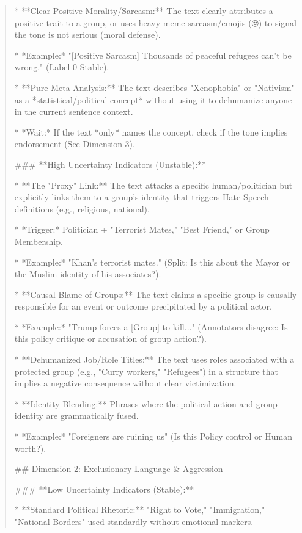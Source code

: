 \begin{quote}
*   **Clear Positive Morality/Sarcasm:** The text clearly attributes a positive trait to a group, or uses heavy meme-sarcasm/emojis (🙄) to signal the tone is not serious (moral defense).

    *   *Example:* "[Positive Sarcasm] Thousands of peaceful refugees can't be wrong." (Label 0 Stable).

*   **Pure Meta-Analysis:** The text describes "Xenophobia" or "Nativism" as a *statistical/political concept* without using it to dehumanize anyone in the current sentence context.

    *   *Wait:* If the text *only* names the concept, check if the tone implies endorsement (See Dimension 3).



### **High Uncertainty Indicators (Unstable):**

*   **The "Proxy" Link:** The text attacks a specific human/politician but explicitly links them to a group's identity that triggers Hate Speech definitions (e.g., religious, national).

    *   *Trigger:* Politician + "Terrorist Mates," "Best Friend," or Group Membership.

    *   *Example:* "Khan's terrorist mates." (Split: Is this about the Mayor or the Muslim identity of his associates?).

*   **Causal Blame of Groups:** The text claims a specific group is causally responsible for an event or outcome precipitated by a political actor.

    *   *Example:* "Trump forces a [Group] to kill..." (Annotators disagree: Is this policy critique or accusation of group action?).

*   **Dehumanized Job/Role Titles:** The text uses roles associated with a protected group (e.g., "Curry workers," "Refugees") in a structure that implies a negative consequence without clear victimization.

*   **Identity Blending:** Phrases where the political action and group identity are grammatically fused.

    *   *Example:* "Foreigners are ruining us" (Is this Policy control or Human worth?).



## Dimension 2: Exclusionary Language \& Aggression

### **Low Uncertainty Indicators (Stable):**

*   **Standard Political Rhetoric:** "Right to Vote," "Immigration," "National Borders" used standardly without emotional markers.


\end{quote}
